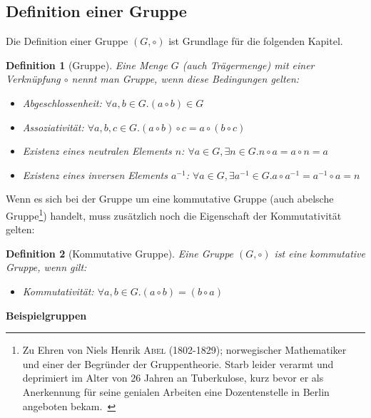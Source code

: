 \documentclass[12pt,a4paper, usenames, dvipsnames]{article}
\newtheorem{definition}{Definition}
\begin{document}
\subsection*{Definition einer Gruppe} 


Die Definition einer Gruppe $(G, \circ)$ ist Grundlage für die folgenden Kapitel. 

\begin{singlespacing}
\begin{definition}[Gruppe]
Eine Menge $G$ (auch Trägermenge) mit einer Verknüpfung $\circ$ nennt man Gruppe, wenn diese Bedingungen gelten: 
\begin{itemize}
\item Abgeschlossenheit: $\forall a,b \in G.(a \circ b) \in G $
\item Assoziativität: $\forall a,b,c \in G.(a \circ b) \circ c = a \circ (b \circ c)$
\item Existenz eines neutralen Elements $n$: $\forall a \in G, \exists n \in G.n \circ a = a \circ n = a$ 
\item Existenz eines inversen Elements $a^{-1}$: $\forall a \in G, \exists a^{-1} \in G. a \circ a^{-1} = a^{-1} \circ a = n$ 
\end{itemize}
\end{definition}
\end{singlespacing}
Wenn es sich bei der Gruppe um eine kommutative Gruppe (auch abelsche Gruppe\footnote{\glqq Zu Ehren von Niels Henrik \textsc{Abel} (1802-1829); norwegischer Mathematiker und einer der Begründer der Gruppentheorie. Starb leider verarmt und deprimiert im Alter von 26 Jahren an Tuberkulose, kurz bevor er als Anerkennung für seine genialen Arbeiten  eine Dozentenstelle in Berlin angeboten bekam.\grqq \  \cite[S.21, Z.23]{Buch}}) handelt, muss zusätzlich noch die Eigenschaft der Kommutativität gelten: 
\begin{singlespacing}
\begin{definition}[Kommutative Gruppe]
Eine Gruppe $(G, \circ)$ ist eine kommutative Gruppe, wenn gilt:
\begin{itemize}
\item Kommutativität: $\forall a,b \in G.(a \circ b) = (b \circ a) $
\end{itemize}
\end{definition}
\end{singlespacing}

\textbf{Beispielgruppen}
\end{document}

